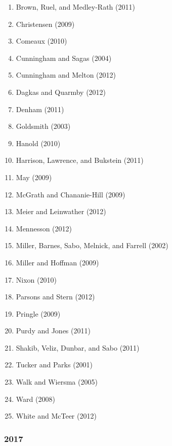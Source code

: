 \documentclass[english,man]{apa6}
\providecommand{\tightlist}{%
  \setlength{\itemsep}{0pt}\setlength{\parskip}{0pt}}
\begin{document}
\begin{enumerate}
\def\labelenumi{\arabic{enumi})}
\tightlist
\item
  Brown, Ruel, and Medley-Rath (2011)
\item
  Christensen (2009)
\item
  Comeaux (2010)
\item
  Cunningham and Sagas (2004)
\item
  Cunningham and Melton (2012)
\item
  Dagkas and Quarmby (2012)
\item
  Denham (2011)
\item
  Goldsmith (2003)
\item
  Hanold (2010)
\item
  Harrison, Lawrence, and Bukstein (2011)
\item
  May (2009)
\item
  McGrath and Chananie-Hill (2009)
\item
  Meier and Leinwather (2012)
\item
  Mennesson (2012)
\item
  Miller, Barnes, Sabo, Melnick, and Farrell (2002)
\item
  Miller and Hoffman (2009)
\item
  Nixon (2010)
\item
  Parsons and Stern (2012)
\item
  Pringle (2009)
\item
  Purdy and Jones (2011)
\item
  Shakib, Veliz, Dunbar, and Sabo (2011)
\item
  Tucker and Parks (2001)
\item
  Walk and Wiersma (2005)
\item
  Ward (2008)
\item
  White and McTeer (2012)
\end{enumerate}

\subsubsection{2017}\label{section-53}
\end{document}
